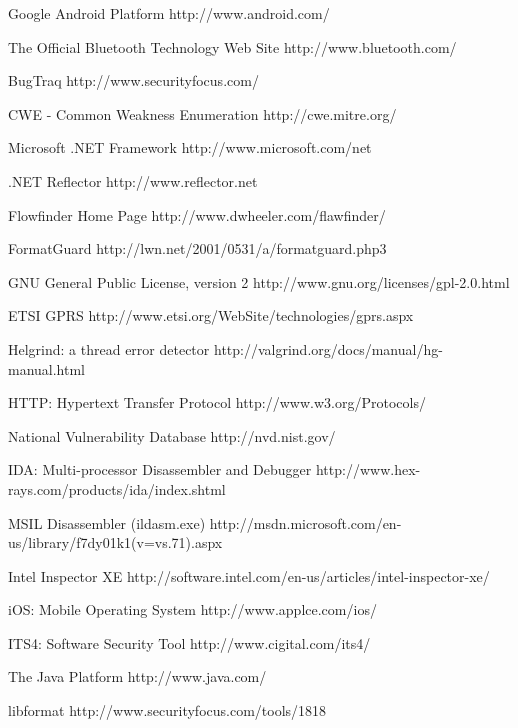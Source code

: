 \begin{thebibliography}{9}
		{Google Android Platform}
		{http://www.android.com/}
	
		{The Official Bluetooth Technology Web Site}
		{http://www.bluetooth.com/}

		{BugTraq}
		{http://www.securityfocus.com/}

		{CWE - Common Weakness Enumeration}
		{http://cwe.mitre.org/}
	
		{Microsoft .NET Framework}
		{http://www.microsoft.com/net}

		{.NET Reflector}
		{http://www.reflector.net}

		{Flowfinder Home Page}
		{http://www.dwheeler.com/flawfinder/}

		{FormatGuard}
		{http://lwn.net/2001/0531/a/formatguard.php3}

		{GNU General Public License, version 2}
		{http://www.gnu.org/licenses/gpl-2.0.html}

		{ETSI GPRS}
		{http://www.etsi.org/WebSite/technologies/gprs.aspx}

		{Helgrind: a thread error detector}
		{http://valgrind.org/docs/manual/hg-manual.html}

		{HTTP: Hypertext Transfer Protocol}
		{http://www.w3.org/Protocols/}

		{National Vulnerability Database}
		{http://nvd.nist.gov/}

		{IDA: Multi-processor Disassembler and Debugger}
		{http://www.hex-rays.com/products/ida/index.shtml}

		{MSIL Disassembler (ildasm.exe)}
		{http://msdn.microsoft.com/en-us/library/f7dy01k1(v=vs.71).aspx}

		{Intel Inspector XE}
		{http://software.intel.com/en-us/articles/intel-inspector-xe/}
	
		{iOS: Mobile Operating System}
		{http://www.applce.com/ios/}

		{ITS4: Software Security Tool}
		{http://www.cigital.com/its4/}

		{The Java Platform}
		{http://www.java.com/}
	
		{libformat}
		{http://www.securityfocus.com/tools/1818}


\end{thebibliography}
